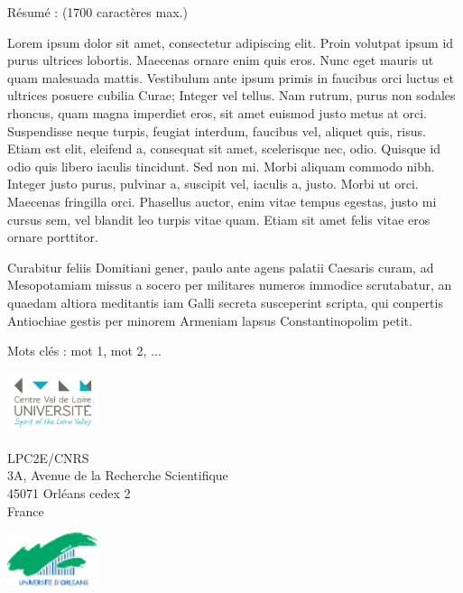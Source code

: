 {\begin{framed}
	\begin{minipage}{\dimexpr\textwidth-2\fboxrule-2\fboxsep}
	R\'esum\'e : (1700 caract\`eres max.)\par
	Lorem ipsum dolor sit amet, consectetur adipiscing elit. Proin volutpat ipsum id purus ultrices lobortis. Maecenas ornare enim quis eros. Nunc eget mauris ut quam malesuada mattis. Vestibulum ante ipsum primis in faucibus orci luctus et ultrices posuere cubilia Curae; Integer vel tellus. Nam rutrum, purus non sodales rhoncus, quam magna imperdiet eros, sit amet euismod justo metus at orci. Suspendisse neque turpis, feugiat interdum, faucibus vel, aliquet quis, risus. Etiam est elit, eleifend a, consequat sit amet, scelerisque nec, odio. Quisque id odio quis libero iaculis tincidunt. Sed non mi. Morbi aliquam commodo nibh. Integer justo purus, pulvinar a, suscipit vel, iaculis a, justo. Morbi ut orci. Maecenas fringilla orci. Phasellus auctor, enim vitae tempus egestas, justo mi cursus sem, vel blandit leo turpis vitae quam. Etiam sit amet felis vitae eros ornare porttitor.\par
	Curabitur feliis Domitiani gener, paulo ante agens palatii Caesaris curam, ad Mesopotamiam missus a socero per militares numeros immodice scrutabatur, an quaedam altiora meditantis iam Galli secreta susceperint scripta, qui conpertis Antiochiae gestis per minorem Armeniam lapsus Constantinopolim petit.\par
Mots cl\'es : mot 1, mot 2, ...
	\end{minipage}
\end{framed}

\includegraphics[width=0.2\textwidth, valign=c]{./images/logos/pucvl}
\hfill
\begin{minipage}{.5\textwidth}
\begin{center}
LPC2E/CNRS\\
3A, Avenue de la Recherche Scientifique\\
45071 Orléans cedex 2\\
France \\
\end{center}
\end{minipage}
\hfill
\includegraphics[width=0.2\textwidth, valign=c]{./images/logos/univ}

}